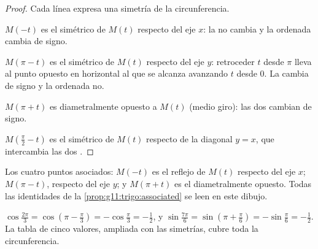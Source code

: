 \begin{proof}
Cada línea expresa una simetría de la circunferencia.

$M(-t)$ es el simétrico de $M(t)$ respecto del eje $x$: la  no
cambia y la ordenada cambia de signo.

$M(\pi - t)$ es el simétrico de $M(t)$ respecto del eje $y$: retroceder
$t$ desde $\pi$ lleva al punto opuesto en horizontal al que se alcanza
avanzando $t$ desde $0$. La  cambia de signo y la ordenada no.

$M(\pi + t)$ es diametralmente opuesto a $M(t)$ (medio giro): las dos
 cambian de signo.

$M\!\left(\frac\pi2 - t\right)$ es el simétrico de $M(t)$ respecto de la
diagonal $y = x$, que intercambia las dos .
\end{proof}

\begin{omfigure}

{\small Los cuatro puntos asociados: $M(-t)$ es el reflejo de $M(t)$
respecto del eje $x$; $M(\pi - t)$, respecto del eje $y$; y
$M(\pi + t)$ es el diametralmente opuesto. Todas las identidades de la
\cref{prop:g11:trigo:associated} se leen en este dibujo.}
\end{omfigure}

\begin{example}
$\cos\frac{2\pi}{3} = \cos\left(\pi - \frac\pi3\right)
= -\cos\frac\pi3 = -\frac12$, y
$\sin\frac{7\pi}{6} = \sin\left(\pi + \frac\pi6\right)
= -\sin\frac\pi6 = -\frac12$. La tabla de cinco valores, ampliada con las
simetrías, cubre toda la circunferencia.
\end{example}

